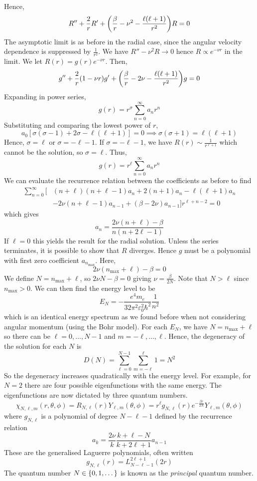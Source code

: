 Hence,
\[
	R'' + \frac{2}{r} R' + \qty(\frac{\beta}{r} - \nu^2 - \frac{\ell(\ell+1)}{r^2})R = 0
\]
The asymptotic limit is as before in the radial case, since the angular velocity dependence is suppressed by \( \frac{1}{r^2} \).
We have \( R'' - \nu^2 R \to 0 \) hence \( R \propto e^{-\nu r} \) in the limit.
We let \( R(r) = g(r) e^{-\nu r} \).
Then,
\[
	g'' + \frac{2}{r} (1 - \nu r) g' + \qty(\frac{\beta}{r} - 2 \nu - \frac{\ell(\ell+1)}{r^2}) g = 0
\]
Expanding in power series,
\[
	g(r) = r^\sigma \sum_{n=0}^\infty a_n r^n
\]
Substituting and comparing the lowest power of \( r \),
\[
	a_0 [ \sigma (\sigma - 1) + 2 \sigma - \ell(\ell + 1) ] = 0 \implies \sigma(\sigma + 1) = \ell(\ell + 1)
\]
Hence, \( \sigma = \ell \) or \( \sigma = -\ell - 1 \).
If \( \sigma = -\ell - 1 \), we have \( R(r) \sim \frac{1}{r^{\ell + 1}} \) which cannot be the solution, so \( \sigma = \ell \).
Thus,
\[
	g(r) = r^\ell \sum_{n=0}^\infty a_n r^n
\]
We can evaluate the recurrence relation between the coefficients as before to find
\begin{align*}
	\sum_{n=0}^\infty [&(n+\ell)(n+\ell - 1)a_n + 2(n+1)a_n - \ell(\ell+1)a_n \\
		&- 2 \nu(n+\ell - 1) a_{n-1} + (\beta - 2\nu) a_{n-1}] r^{\ell + n - 2} = 0
\end{align*}
which gives
\[
	a_n = \frac{2\nu(n+\ell) - \beta}{n(n+2\ell - 1)}
\]
If \( \ell = 0 \) this yields the result for the radial solution.
Unless the series terminates, it is possible to show that \( R \) diverges.
Hence \( g \) must be a polynomial with first zero coefficient \( a_{n_{\max}} \).
Here,
\[
	2\nu(n_{\max} + \ell) - \beta = 0
\]
We define \( N = n_{\max} + \ell \), so \( 2 \nu N - \beta = 0 \) giving \( \nu = \frac{\beta}{2N} \).
Note that \( N > \ell \) since \( n_{\max} > 0 \).
We can then find the energy level to be
\[
	E_N = -\frac{e^4 m_e}{32 \pi^2 \varepsilon_0^2 \hbar^2} \frac{1}{n^2}
\]
which is an identical energy spectrum as we found before when not considering angular momentum (using the Bohr model).
For each \( E_N \), we have \( N = n_{\max} + \ell \) so there can be \( \ell = 0, \dots, N-1 \) and \( m = -\ell, \dots, \ell \).
Hence, the degeneracy of the solution for each \( N \) is
\[
	D(N) = \sum_{\ell=0}^{N-1} \sum_{m=-\ell}^\ell 1 = N^2
\]
So the degeneracy increases quadratically with the energy level.
For example, for \( N = 2 \) there are four possible eigenfunctions with the same energy.
The eigenfunctions are now dictated by three quantum numbers.
\[
	\chi_{N,\ell,m}(r,\theta,\phi) = R_{N,\ell}(r)Y_{\ell,m}(\theta,\phi) = r^\ell g_{N,\ell}(r) e^{-\frac{\beta r}{2N}} Y_{\ell,m}(\theta,\phi)
\]
where \( g_{N,\ell} \) is a polynomial of degree \( N - \ell - 1 \) defined by the recurrence relation
\[
	a_k = \frac{2\nu}{k} \frac{k + \ell - N}{k + 2\ell + 1} a_{n-1}
\]
These are the generalised Laguerre polynomials, often written
\[
	g_{N,\ell}(r) = L_{N - \ell - 1}^{2\ell + 1}(2r)
\]
The quantum number \( N \in \qty{0, 1, \dots} \) is known as the \textit{principal} quantum number.

